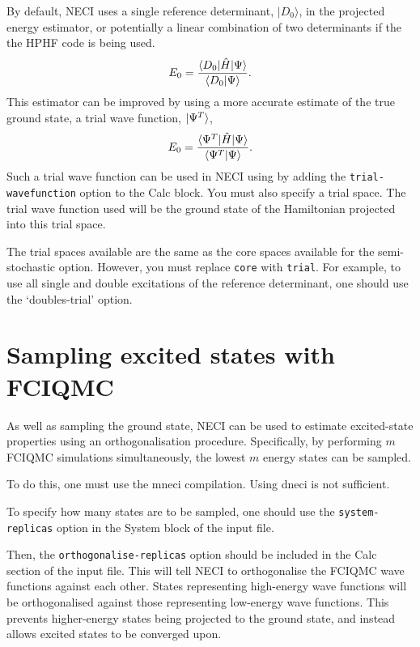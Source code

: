 \documentclass[a4paper,notitlepage,dvipsnames]{scrreprt}
\let\code\lstinline
\begin{document}
    By default, NECI uses a single reference determinant, $|D_0\rangle$, in the
    projected energy estimator, or potentially a linear combination of two
    determinants if the the HPHF code is being used.
    \begin{equation}
        E_0 = \frac{\braket{D_0 | \hat{H} | \Psi}}{\braket{D_0 | \Psi}}.
    \end{equation}
    This estimator can be improved by using a more accurate estimate of the
    true ground state, a trial wave function, $\ket{\Psi^T}$,
    \begin{equation}
        E_0 = \frac{\braket{\Psi^T | \hat{H} | \Psi}}{\braket{\Psi^T | \Psi}}.
    \end{equation}
    Such a trial wave function can be used in NECI using by adding the
    \code{trial-wavefunction} option to the Calc block.
    You must also specify a
    trial space. The trial wave function used will be the ground state of the
    Hamiltonian projected into this trial space.

    The trial spaces available are the same as the core spaces available for
    the semi-stochastic option. However, you must replace \code{core} with
    \code{trial}. For
    example, to use all single and double excitations of the reference
    determinant, one should use the `doubles-trial' option.

\section{Sampling excited states with FCIQMC}

    As well as sampling the ground state, NECI can be used to estimate
    excited-state properties using an orthogonalisation procedure.
    Specifically, by performing $m$ FCIQMC simulations simultaneously,
    the lowest $m$ energy states can be sampled.

    To do this, one must use the mneci compilation. Using dneci is not
    sufficient.

    To specify how many states are to be sampled, one should use the
    \code{system-replicas} option in the System block of the input file.

    Then, the \code{orthogonalise-replicas} option should be included in
    the Calc section of the input file. This will tell NECI to orthogonalise
    the FCIQMC wave functions against each other. States representing
    high-energy wave functions will be orthogonalised against those
    representing low-energy wave functions. This prevents higher-energy
    states being projected to the ground state, and instead allows
    excited states to be converged upon.
\end{document}
